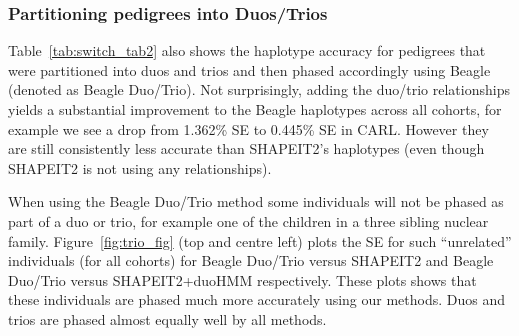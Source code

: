 \subsubsection{Partitioning pedigrees into Duos/Trios}


Table~\ref{tab:switch_tab2}  also shows the haplotype accuracy for pedigrees that were partitioned into duos and trios and then phased accordingly using Beagle (denoted as Beagle Duo/Trio).  Not surprisingly, adding the duo/trio relationships yields a substantial improvement to the Beagle haplotypes across all cohorts, for example we see a drop from 1.362\% SE to 0.445\% SE in CARL. However they are still consistently less accurate than SHAPEIT2's haplotypes (even though SHAPEIT2 is not using any relationships). 

When using the Beagle Duo/Trio method some individuals will not be phased as part of a duo or trio, for example one of the children in a three sibling nuclear family. Figure~\ref{fig:trio_fig} (top and centre left) plots the SE for such ``unrelated'' individuals (for all cohorts) for Beagle Duo/Trio versus SHAPEIT2 and Beagle Duo/Trio versus SHAPEIT2+duoHMM respectively. These plots shows that these individuals are phased much more accurately using our methods. Duos and trios are phased almost equally well by all methods.

